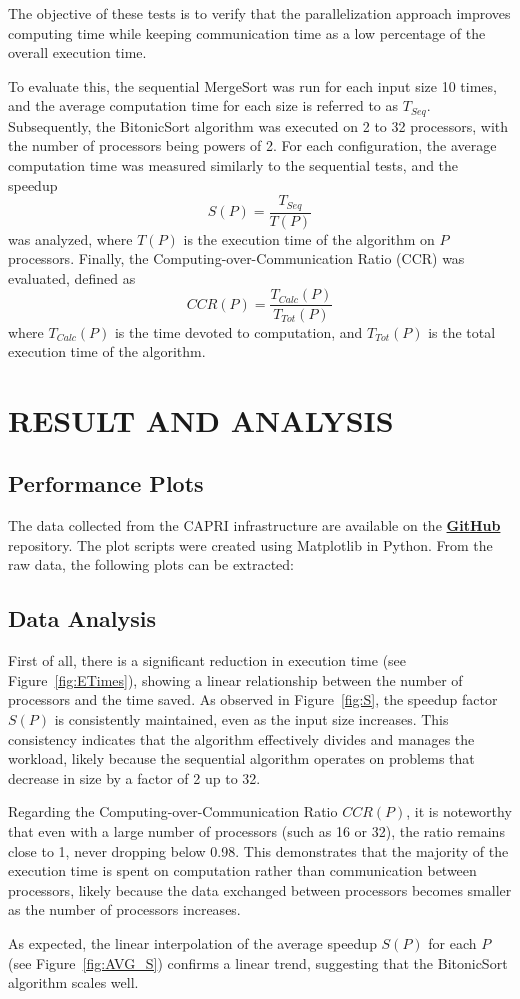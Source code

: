 \documentclass[article,12pt,conference]{ieeeconf} %
\begin{document}
The objective of these tests is to verify that the parallelization approach improves computing time while keeping communication time as a low percentage of the overall execution time. 
\par
To evaluate this, the sequential MergeSort was run for each input size 10 times, and the average computation time for each size is referred to as $T_{Seq}$.
Subsequently, the BitonicSort algorithm was executed on 2 to 32 processors, with the number of processors being powers of 2. For each configuration, the average computation time was measured similarly to the sequential tests, and the speedup$$S(P) = \frac{T_{Seq}}{T(P)}$$ was analyzed, where $T(P)$ is the execution time of the algorithm on $P$ processors.
Finally, the Computing-over-Communication Ratio (CCR) was evaluated, defined as $$CCR(P) = \frac{T_{Calc}(P)}{T_{Tot}(P)}$$ where $T_{Calc}(P)$ is the time devoted to computation, and $T_{Tot}(P)$ is the total execution time of the algorithm.

\section{RESULT AND ANALYSIS}
\subsection{Performance Plots}
The data collected from the CAPRI infrastructure are available on the \textbf{\href{https://github.com/francesco-biscaccia-carrara/BitonicSort}{GitHub}} repository. The plot scripts were created using Matplotlib in Python. From the raw data, the following plots can be extracted:

\subsection{Data Analysis}
First of all, there is a significant reduction in execution time (see Figure~\ref{fig:ETimes}), showing a linear relationship between the number of processors and the time saved. As observed in Figure~\ref{fig:S}, the speedup factor $S(P)$ is consistently maintained, even as the input size increases. This consistency indicates that the algorithm effectively divides and manages the workload, likely because the sequential algorithm operates on problems that decrease in size by a factor of 2 up to 32.\par
Regarding the Computing-over-Communication Ratio $CCR(P)$, it is noteworthy that even with a large number of processors (such as 16 or 32), the ratio remains close to 1, never dropping below 0.98. This demonstrates that the majority of the execution time is spent on computation rather than communication between processors, likely because the data exchanged between processors becomes smaller as the number of processors increases.\par
As expected, the linear interpolation of the average speedup $S(P)$ for each $P$ (see Figure~\ref{fig:AVG_S}) confirms a linear trend, suggesting that the BitonicSort algorithm scales well.
\end{document}
